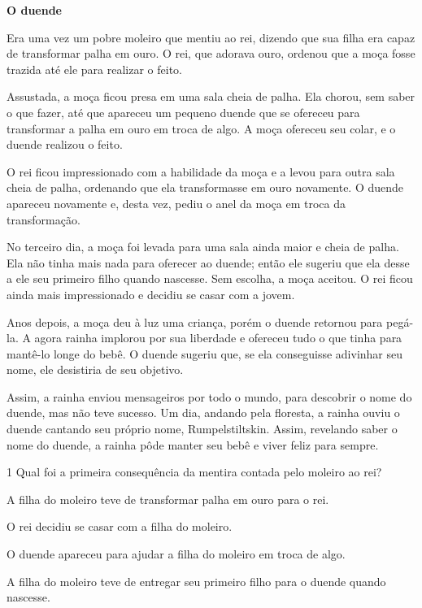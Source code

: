 \begin{myquote}
\textbf{O duende}

Era uma vez um pobre moleiro que mentiu ao rei, dizendo que sua filha
era capaz de transformar palha em ouro. O rei, que adorava ouro, ordenou
que a moça fosse trazida até ele para realizar o feito.

Assustada, a moça ficou presa em uma sala cheia de palha. Ela chorou,
sem saber o que fazer, até que apareceu um pequeno duende que se
ofereceu para transformar a palha em ouro em troca de algo. A moça
ofereceu seu colar, e o duende realizou o feito.

O rei ficou impressionado com a habilidade da moça e a levou para outra
sala cheia de palha, ordenando que ela transformasse em ouro novamente.
O duende apareceu novamente e, desta vez, pediu o anel da moça em troca
da transformação.

No terceiro dia, a moça foi levada para uma sala ainda maior e cheia de
palha. Ela não tinha mais nada para oferecer ao duende; então ele
sugeriu que ela desse a ele seu primeiro filho quando nascesse. Sem
escolha, a moça aceitou. O rei ficou ainda mais impressionado e decidiu
se casar com a jovem.

Anos depois, a moça deu à luz uma criança, porém o duende retornou para
pegá-la. A agora rainha implorou por sua liberdade e ofereceu tudo o que
tinha para mantê-lo longe do bebê. O duende sugeriu que, se ela
conseguisse adivinhar seu nome, ele desistiria de seu objetivo.

Assim, a rainha enviou mensageiros por todo o mundo, para descobrir o
nome do duende, mas não teve sucesso. Um dia, andando pela floresta, a
rainha ouviu o duende cantando seu próprio nome, Rumpelstiltskin. Assim,
revelando saber o nome do duende, a rainha pôde manter seu bebê e viver
feliz para sempre.

\end{myquote}

\num{1} Qual foi a primeira consequência da mentira contada pelo moleiro ao rei?

\begin{escolha}
\item A filha do moleiro teve de transformar palha em ouro para o rei.

\item O rei decidiu se casar com a filha do moleiro.

\item O duende apareceu para ajudar a filha do moleiro em troca de algo.

\item A filha do moleiro teve de entregar seu primeiro filho para o duende quando nascesse.
\end{escolha}



